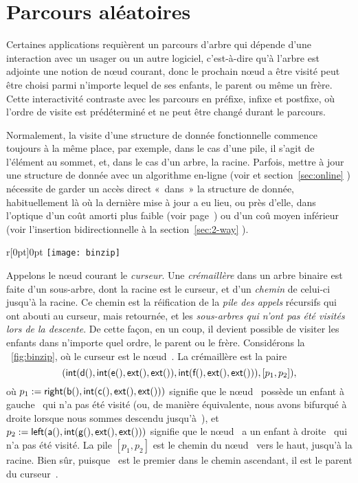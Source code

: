 \section{Parcours aléatoires}

Certaines applications requièrent un parcours d'arbre qui dépende
d'une interaction avec un usager ou un autre logiciel, c'est-à-dire
qu'à l'arbre est adjointe une notion de nœud courant, donc le
prochain nœud a être visité peut être choisi parmi n'importe
lequel de ses enfants, le parent ou même un frère. Cette interactivité
contraste avec les parcours en préfixe, infixe et postfixe, où l'ordre
de visite est prédéterminé et ne peut être changé durant le parcours.

Normalement, la visite d'une structure de donnée fonctionnelle
commence toujours à la même place, par exemple, dans le cas d'une
pile, il s'agit de l'élément au sommet, et, dans le cas d'un arbre, la
racine. Parfois, mettre à jour une structure de donnée avec un
algorithme en-ligne (voir  et
section~\ref{sec:online} ) nécessite de garder un
accès direct «~dans~» la structure de donnée, habituellement là où la
dernière mise à jour a eu lieu, ou près d'elle, dans l'optique d'un
coût amorti plus faible (voir page~\pageref{par:amortised_cost}) ou
d'un coû moyen inférieur (voir l'insertion bidirectionnelle à la
section~\ref{sec:2-way} ).

\begin{wrapfigure}[7]{r}[0pt]{0pt}
\centering
\texttt{[image: binzip]}
\caption{}
\label{fig:binzip}
\end{wrapfigure}
Appelons le nœud courant le \emph{curseur}. Une \emph{crémaillère} dans un arbre binaire est faite d'un
sous-arbre, dont la racine est le curseur, et d'un \emph{chemin} de
celui-ci jusqu'à la racine. Ce chemin est la réification de la
\emph{pile des appels}
récursifs qui ont abouti au curseur, mais retournée, et les
\emph{sous-arbres qui n'ont pas été visités lors de la descente}.  De
cette façon, en un coup, il devient possible de visiter les enfants
dans n'importe quel ordre, le parent ou le frère. Considérons la
\fig~\ref{fig:binzip}, où le curseur est le nœud~. La
crémaillère est la paire
\begin{equation*}
\pair{\fun{int}(\fun{d}(),\fun{int}(\fun{e}(),\fun{ext}(),\fun{ext}()),
\fun{int}(\fun{f}(),\fun{ext}(),\fun{ext}()))}%
{[p_1,p_2]},
\end{equation*}
où \(p_1 := \textsf{right}(\textsf{b}(), \textsf{int}(\textsf{c}(), \textsf{ext}(),
\textsf{ext}()))\) signifie que le nœud~ possède un enfant à
gauche~ qui n'a pas été visité (ou, de manière équivalente,
nous avons bifurqué à droite lorsque nous sommes descendu
jusqu'à~), et \(p_2 := \textsf{left}(\textsf{a}(),
\textsf{int}(\textsf{g}(), \textsf{ext}(), \textsf{ext}()))\) signifie que le
nœud~ a un enfant à droite~ qui n'a pas été
visité. La pile \([p_1,p_2]\) est le chemin du nœud~ vers
le haut, jusqu'à la racine. Bien sûr, puisque ~est le premier
dans le chemin ascendant, il est le parent du curseur~.

